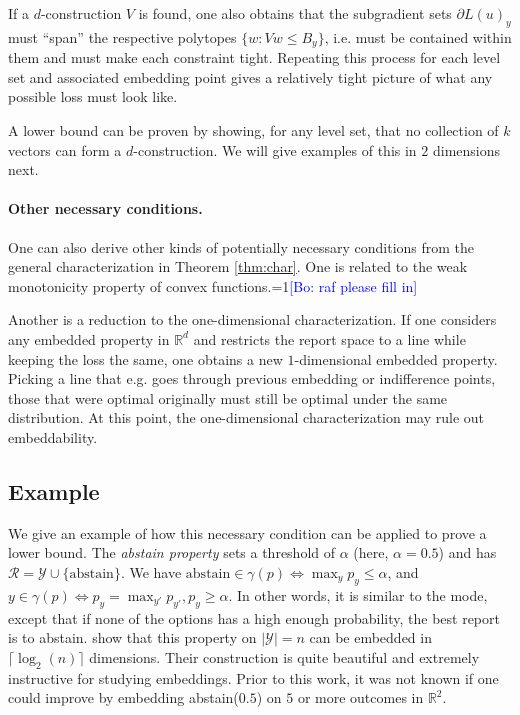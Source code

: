 \documentclass[anon,12pt]{colt2019}
\newcommand{\Comments}{1}
\newcommand{\mynote}[2]{\ifnum\Comments=1\textcolor{#1}{#2}\fi}
\newcommand{\bo}[1]{\mynote{blue}{[Bo: #1]}}
\newcommand{\reals}{\mathbb{R}}
\newcommand{\R}{\mathcal{R}}
\newcommand{\Y}{\mathcal{Y}}
\begin{document}
If a $d$-construction $V$ is found, one also obtains that the subgradient sets $\partial L(u)_y$ must ``span'' the respective polytopes $\{w : Vw \leq B_y\}$, i.e. must be contained within them and must make each constraint tight.
Repeating this process for each level set and associated embedding point gives a relatively tight picture of what any possible loss must look like.

A lower bound can be proven by showing, for any level set, that no collection of $k$ vectors can form a $d$-construction.
We will give examples of this in $2$ dimensions next.

\paragraph{Other necessary conditions.}
One can also derive other kinds of potentially necessary conditions from the general characterization in Theorem \ref{thm:char}.
One is related to the weak monotonicity property of convex functions.\bo{raf please fill in}

Another is a reduction to the one-dimensional characterization. If one considers any embedded property in $\reals^d$ and restricts the report space to a line while keeping the loss the same, one obtains a new $1$-dimensional embedded property.
Picking a line that e.g. goes through previous embedding or indifference points, those that were optimal originally must still be optimal under the same distribution.
At this point, the one-dimensional characterization may rule out embeddability.


\subsection{Example}
We give an example of how this necessary condition can be applied to prove a lower bound.
The \emph{abstain property} sets a threshold of $\alpha$ (here, $\alpha=0.5$) and has $\R = \Y \cup \{\text{abstain}\}$.
We have $\text{abstain} \in \gamma(p) \iff \max_y p_y \leq \alpha$, and $y \in \gamma(p) \iff p_y = \max_{y'} p_{y'}, p_y \geq \alpha$.
In other words, it is similar to the mode, except that if none of the options has a high enough probability, the best report is to abstain.
\citet{ramaswamy2018consistent} show that this property on $|\Y|=n$ can be embedded in $\lceil \log_2(n) \rceil$ dimensions.
Their construction is quite beautiful and extremely instructive for studying embeddings.
Prior to this work, it was not known if one could improve by embedding abstain($0.5$) on $5$ or more outcomes in $\reals^2$.
\end{document}
